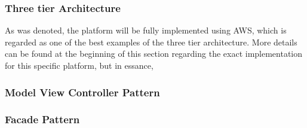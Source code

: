 \subsubsection{Three tier Architecture}
As was denoted, the platform will be fully implemented using AWS, which is regarded as one of the best examples of the three tier architecture. More details can be found at the beginning of this section regarding the exact implementation for this specific platform, but in essance, 
\subsubsection{Model View Controller Pattern}

\subsubsection{Facade Pattern}